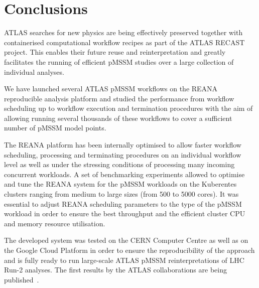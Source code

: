 \section{Conclusions}\label{sec:conclusions}

ATLAS searches for new physics are being effectively preserved together with containerised computational workflow recipes as part of the ATLAS RECAST project.
This enables their future reuse and reinterpretation and greatly facilitates the running of efficient pMSSM studies over a large collection of individual analyses.

We have launched several ATLAS pMSSM workflows on the REANA reproducible analysis platform and studied the performance from workflow scheduling up to workflow execution and termination procedures with the aim of allowing running several thousands of these workflows to cover a sufficient number of pMSSM model points.

The REANA platform has been internally optimised to allow faster workflow scheduling, processing and terminating procedures on an individual workflow level as well as under the stressing conditions of processing many incoming concurrent workloads.
A set of benchmarking experiments allowed to optimise and tune the REANA system for the pMSSM workloads on the Kuberentes clusters ranging from medium to large sizes (from 500 to 5000 cores).
It was essential to adjust REANA scheduling parameters to the type of the pMSSM workload in order to ensure the best throughput and the efficient cluster CPU and memory resource utilisation.

The developed system was tested on the CERN Computer Centre as well as on the Google Cloud Platform in order to ensure the reproducibility of the approach and is fully ready to run large-scale ATLAS pMSSM reinterpretations of LHC Run-2 analyses.
The first results by the ATLAS collaborations are being published~\cite{ATLAS:2023oun}.
